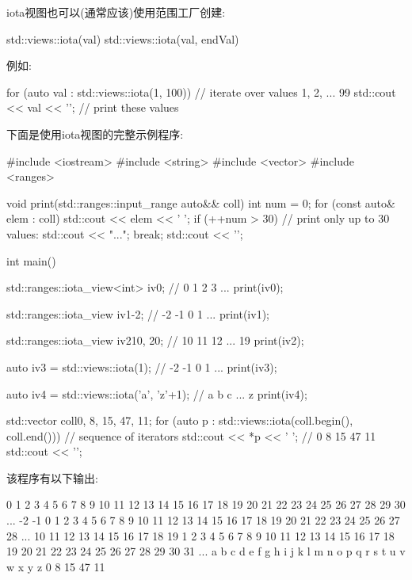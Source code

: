 
iota视图也可以(通常应该)使用范围工厂创建:

\begin{cpp}
std::views::iota(val)
std::views::iota(val, endVal)
\end{cpp}

例如:

\begin{cpp}
for (auto val : std::views::iota(1, 100)) { // iterate over values 1, 2, ... 99
	std::cout << val << '\n'; // print these values
}
\end{cpp}

下面是使用iota视图的完整示例程序:


\begin{cpp}
#include <iostream>
#include <string>
#include <vector>
#include <ranges>

void print(std::ranges::input_range auto&& coll)
{
	int num = 0;
	for (const auto& elem : coll) {
		std::cout << elem << ' ';
		if (++num > 30) { // print only up to 30 values:
			std::cout << "...";
			break;
		}
	}
	std::cout << '\n';
}

int main()
{
	std::ranges::iota_view<int> iv0; // 0 1 2 3 ...
	print(iv0);
	
	std::ranges::iota_view iv1{-2}; // -2 -1 0 1 ...
	print(iv1);
	
	std::ranges::iota_view iv2{10, 20}; // 10 11 12 ... 19
	print(iv2);
	
	auto iv3 = std::views::iota(1); // -2 -1 0 1 ...
	print(iv3);
	
	auto iv4 = std::views::iota('a', 'z'+1); // a b c ... z
	print(iv4);
	
	std::vector coll{0, 8, 15, 47, 11};
	for (auto p : std::views::iota(coll.begin(), coll.end())) { // sequence of iterators
		std::cout << *p << ' '; // 0 8 15 47 11
	}
	std::cout << '\n';
}
\end{cpp}

该程序有以下输出:

\begin{shell}
0 1 2 3 4 5 6 7 8 9 10 11 12 13 14 15 16 17 18 19 20 21 22 23 24 25 26 27 28 29 30 ...
-2 -1 0 1 2 3 4 5 6 7 8 9 10 11 12 13 14 15 16 17 18 19 20 21 22 23 24 25 26 27 28 ...
10 11 12 13 14 15 16 17 18 19
1 2 3 4 5 6 7 8 9 10 11 12 13 14 15 16 17 18 19 20 21 22 23 24 25 26 27 28 29 30 31 ...
a b c d e f g h i j k l m n o p q r s t u v w x y z
0 8 15 47 11	
\end{shell}

